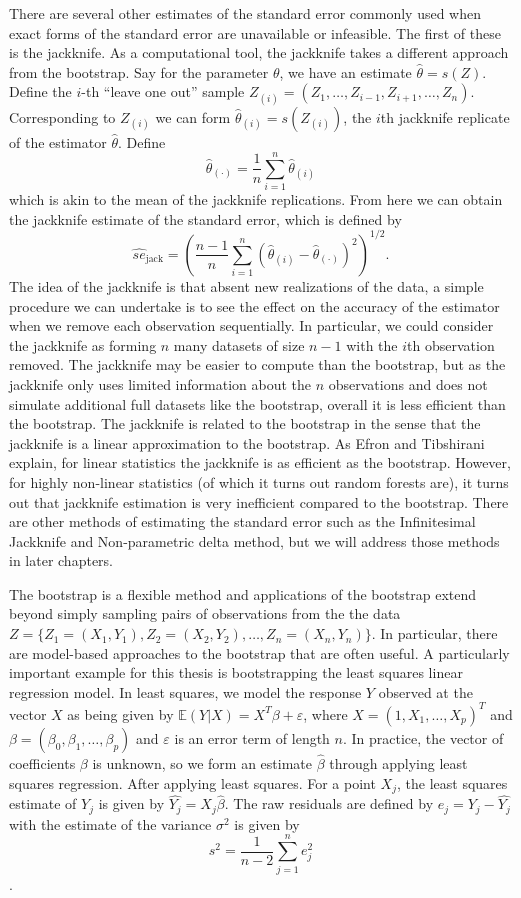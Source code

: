 \documentclass[12pt,twoside]{reedthesis}
\theoremstyle{definition}
\theoremstyle{definition}
\theoremstyle{definition}
\theoremstyle{remark}
\begin{document}
There are several other estimates of the standard error commonly used
when exact forms of the standard error are unavailable or infeasible.
The first of these is the jackknife. As a computational tool, the
jackknife takes a different approach from the bootstrap. Say for the
parameter \(\theta\), we have an estimate \(\hat{\theta}=s(Z)\). Define
the \(i\)-th ``leave one out'' sample
\(Z_{(i)}=(Z_1,\ldots,Z_{i-1},Z_{i+1},\ldots,Z_{n})\). Corresponding to
\(Z_{(i)}\) we can form \(\hat{\theta}_{(i)}=s(Z_{(i)})\), the \(i\)th
jackknife replicate of the estimator \(\hat{\theta}\). Define
\[\hat{\theta}_{(\cdot)}=\frac{1}{n}\sum_{i=1}^n \hat{\theta}_{(i)}\]
which is akin to the mean of the jackknife replications. From here we
can obtain the jackknife estimate of the standard error, which is
defined by
\[\widehat{se}_\text{jack} =\left(\frac{n-1}{n}\sum_{i=1}^n (\hat{\theta}_{(i)}-\hat{\theta}_{(\cdot)})^2\right)^{1/2}.\]
The idea of the jackknife is that absent new realizations of the data, a
simple procedure we can undertake is to see the effect on the accuracy
of the estimator when we remove each observation sequentially. In
particular, we could consider the jackknife as forming \(n\) many
datasets of size \(n-1\) with the \(i\)th observation removed. The
jackknife may be easier to compute than the bootstrap, but as the
jackknife only uses limited information about the \(n\) observations and
does not simulate additional full datasets like the bootstrap, overall
it is less efficient than the bootstrap. The jackknife is related to the
bootstrap in the sense that the jackknife is a linear approximation to
the bootstrap. As Efron and Tibshirani explain, for linear statistics
the jackknife is as efficient as the bootstrap. However, for highly
non-linear statistics (of which it turns out random forests are), it
turns out that jackknife estimation is very inefficient compared to the
bootstrap. There are other methods of estimating the standard error such
as the Infinitesimal Jackknife and Non-parametric delta method, but we
will address those methods in later chapters.

The bootstrap is a flexible method and applications of the bootstrap
extend beyond simply sampling pairs of observations from the the data
\(Z=\{Z_1=(X_1,Y_1), Z_2=(X_2,Y_2),\ldots, Z_n=(X_n,Y_n)\}\). In
particular, there are model-based approaches to the bootstrap that are
often useful. A particularly important example for this thesis is
bootstrapping the least squares linear regression model. In least
squares, we model the response \(Y\) observed at the vector \(X\) as
being given by \(\mathbb{E}(Y|X)=X^T\beta+\varepsilon\), where
\(X=(1,X_1,\ldots,X_p)^T\) and
\(\beta=(\beta_0,\beta_1,\ldots,\beta_p)\) and \(\varepsilon\) is an
error term of length \(n\). In practice, the vector of coefficients
\(\beta\) is unknown, so we form an estimate \(\hat{\beta}\) through
applying least squares regression. After applying least squares. For a
point \(X_j\), the least squares estimate of \(Y_j\) is given by
\(\hat{Y_j}=X_j\hat{\beta}\). The raw residuals are defined by
\(e_j=Y_j-\hat{Y_j}\) with the estimate of the variance \(\sigma^2\) is
given by \[s^2=\frac{1}{n-2}\sum_{j=1}^n e_j^2\].
\end{document}
